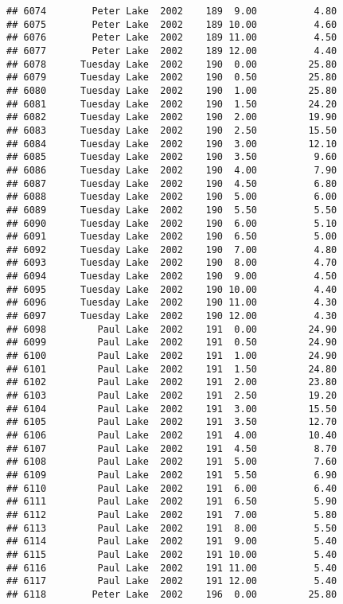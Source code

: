 \documentclass[
]{article}
\begin{document}
\begin{verbatim}
## 6074        Peter Lake  2002    189  9.00          4.80
## 6075        Peter Lake  2002    189 10.00          4.60
## 6076        Peter Lake  2002    189 11.00          4.50
## 6077        Peter Lake  2002    189 12.00          4.40
## 6078      Tuesday Lake  2002    190  0.00         25.80
## 6079      Tuesday Lake  2002    190  0.50         25.80
## 6080      Tuesday Lake  2002    190  1.00         25.80
## 6081      Tuesday Lake  2002    190  1.50         24.20
## 6082      Tuesday Lake  2002    190  2.00         19.90
## 6083      Tuesday Lake  2002    190  2.50         15.50
## 6084      Tuesday Lake  2002    190  3.00         12.10
## 6085      Tuesday Lake  2002    190  3.50          9.60
## 6086      Tuesday Lake  2002    190  4.00          7.90
## 6087      Tuesday Lake  2002    190  4.50          6.80
## 6088      Tuesday Lake  2002    190  5.00          6.00
## 6089      Tuesday Lake  2002    190  5.50          5.50
## 6090      Tuesday Lake  2002    190  6.00          5.10
## 6091      Tuesday Lake  2002    190  6.50          5.00
## 6092      Tuesday Lake  2002    190  7.00          4.80
## 6093      Tuesday Lake  2002    190  8.00          4.70
## 6094      Tuesday Lake  2002    190  9.00          4.50
## 6095      Tuesday Lake  2002    190 10.00          4.40
## 6096      Tuesday Lake  2002    190 11.00          4.30
## 6097      Tuesday Lake  2002    190 12.00          4.30
## 6098         Paul Lake  2002    191  0.00         24.90
## 6099         Paul Lake  2002    191  0.50         24.90
## 6100         Paul Lake  2002    191  1.00         24.90
## 6101         Paul Lake  2002    191  1.50         24.80
## 6102         Paul Lake  2002    191  2.00         23.80
## 6103         Paul Lake  2002    191  2.50         19.20
## 6104         Paul Lake  2002    191  3.00         15.50
## 6105         Paul Lake  2002    191  3.50         12.70
## 6106         Paul Lake  2002    191  4.00         10.40
## 6107         Paul Lake  2002    191  4.50          8.70
## 6108         Paul Lake  2002    191  5.00          7.60
## 6109         Paul Lake  2002    191  5.50          6.90
## 6110         Paul Lake  2002    191  6.00          6.40
## 6111         Paul Lake  2002    191  6.50          5.90
## 6112         Paul Lake  2002    191  7.00          5.80
## 6113         Paul Lake  2002    191  8.00          5.50
## 6114         Paul Lake  2002    191  9.00          5.40
## 6115         Paul Lake  2002    191 10.00          5.40
## 6116         Paul Lake  2002    191 11.00          5.40
## 6117         Paul Lake  2002    191 12.00          5.40
## 6118        Peter Lake  2002    196  0.00         25.80

\end{verbatim}
\end{document}
